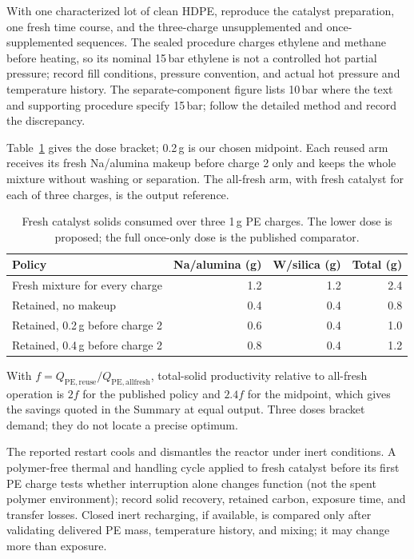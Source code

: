 With one characterized lot of clean HDPE, reproduce the catalyst preparation, one fresh time course, and the three-charge unsupplemented and once-supplemented sequences. The sealed procedure charges ethylene and methane before heating, so its nominal 15\,bar ethylene is not a controlled hot partial pressure; record fill conditions, pressure convention, and actual hot pressure and temperature history. The separate-component figure lists 10\,bar where the text and supporting procedure specify 15\,bar; follow the detailed method and record the discrepancy.\cite{conk2024,conk2024si}

Table~\ref{tab:polymer-makeup} gives the dose bracket; 0.2\,g is our chosen midpoint. Each reused arm receives its fresh Na/alumina makeup before charge 2 only and keeps the whole mixture without washing or separation. The all-fresh arm, with fresh catalyst for each of three charges, is the output reference.

\begin{table}[ht]
\centering
\caption{Fresh catalyst solids consumed over three 1\,g PE charges. The lower dose is proposed; the full once-only dose is the published comparator.}
\label{tab:polymer-makeup}
\begin{tabular}{@{}lrrr@{}}
\toprule
Policy & Na/alumina (g) & W/silica (g) & Total (g)\\
\midrule
Fresh mixture for every charge & 1.2 & 1.2 & 2.4\\
Retained, no makeup & 0.4 & 0.4 & 0.8\\
Retained, 0.2\,g before charge 2 & 0.6 & 0.4 & 1.0\\
Retained, 0.4\,g before charge 2 & 0.8 & 0.4 & 1.2\\
\bottomrule
\end{tabular}
\end{table}

With $f=Q_{\mathrm{PE,reuse}}/Q_{\mathrm{PE,allfresh}}$, total-solid productivity relative to all-fresh operation is $2f$ for the published policy and $2.4f$ for the midpoint, which gives the savings quoted in the Summary at equal output. Three doses bracket demand; they do not locate a precise optimum.

The reported restart cools and dismantles the reactor under inert conditions. A polymer-free thermal and handling cycle applied to fresh catalyst before its first PE charge tests whether interruption alone changes function (not the spent polymer environment); record solid recovery, retained carbon, exposure time, and transfer losses. Closed inert recharging, if available, is compared only after validating delivered PE mass, temperature history, and mixing; it may change more than exposure.

